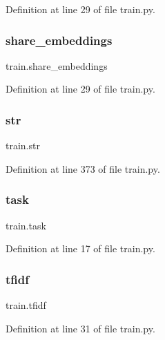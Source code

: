 Definition at line 29 of file train.\+py.

\mbox{\label{namespacetrain_a781c403aaa147370f9f172ce4f85323e}} 
\subsubsection{\texorpdfstring{share\+\_\+embeddings}{share\_embeddings}}
{\footnotesize\ttfamily train.\+share\+\_\+embeddings}



Definition at line 29 of file train.\+py.

\mbox{\label{namespacetrain_aaa59b213583fa39039d4c2a897f9009c}} 
\subsubsection{\texorpdfstring{str}{str}}
{\footnotesize\ttfamily train.\+str}



Definition at line 373 of file train.\+py.

\mbox{\label{namespacetrain_ab147c18a1adffb88116dd83812304ac7}} 
\subsubsection{\texorpdfstring{task}{task}}
{\footnotesize\ttfamily train.\+task}



Definition at line 17 of file train.\+py.

\mbox{\label{namespacetrain_ac53cf81dd9f6ec5ae1b3b18b036c3679}} 
\subsubsection{\texorpdfstring{tfidf}{tfidf}}
{\footnotesize\ttfamily train.\+tfidf}



Definition at line 31 of file train.\+py.

